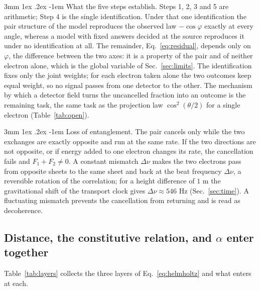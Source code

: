 \documentclass[%
 reprint, amsmath,amssymb, aps, prb, ]{revtex4-2}
\makeatletter
\numberwithin{equation}{section}
\renewcommand\paragraph{%
  \@startsection{paragraph}{4}{\z@}%
    {3mm \@plus 1ex \@minus .2ex}%
    {-1em}%
    {\normalfont\normalsize\itshape}}
\makeatother
\begin{document}
\paragraph{What the five steps establish.} Steps 1, 2, 3 and 5 are arithmetic; Step 4 is the single identification. Under that one identification the pair structure of the model reproduces the observed law $-\cos\varphi$ exactly at every angle, whereas a model with fixed answers decided at the source reproduces it under no identification at all. The remainder, Eq.~\eqref{eq:residual}, depends only on $\varphi$, the difference between the two axes: it is a property of the pair and of neither electron alone, which is the global variable of Sec.~\ref{sec:limits}. The identification fixes only the joint weights; for each electron taken alone the two outcomes keep equal weight, so no signal passes from one detector to the other. The mechanism by which a detector field turns the uncancelled fraction into an outcome is the remaining task, the same task as the projection law $\cos^2(\theta/2)$ for a single electron (Table~\ref{tab:open}).

\paragraph{Loss of entanglement.} The pair cancels only while the two exchanges are exactly opposite and run at the same rate. If the two directions are not opposite, or if energy added to one electron changes its rate, the cancellation fails and $F_1+F_2\neq0$. A constant mismatch $\Delta\nu$ makes the two electrons pass from opposite sheets to the same sheet and back at the beat frequency $\Delta\nu$, a reversible rotation of the correlation; for a height difference of $1$ m the gravitational shift of the transport clock gives $\Delta\nu\approx546$ Hz (Sec.~\ref{sec:time}). A fluctuating mismatch prevents the cancellation from returning and is read as decoherence.

\subsection{Distance, the constitutive relation, and $\alpha$ enter together}

Table~\ref{tab:layers} collects the three layers of Eq.~\eqref{eq:helmholtz} and what enters at each.
\end{document}
